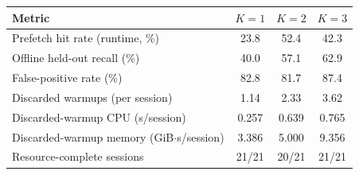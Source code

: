 \begin{tabular}{lccc}
\toprule
Metric & $K=1$ & $K=2$ & $K=3$ \\
\midrule
Prefetch hit rate (runtime, \%) & 23.8 & 52.4 & 42.3 \\
Offline held-out recall (\%) & 40.0 & 57.1 & 62.9 \\
False-positive rate (\%) & 82.8 & 81.7 & 87.4 \\
Discarded warmups (per session) & 1.14 & 2.33 & 3.62 \\
Discarded-warmup CPU (s/session) & 0.257 & 0.639 & 0.765 \\
Discarded-warmup memory (GiB$\cdot$s/session) & 3.386 & 5.000 & 9.356 \\
Resource-complete sessions & 21/21 & 20/21 & 21/21 \\
\bottomrule
\end{tabular}

